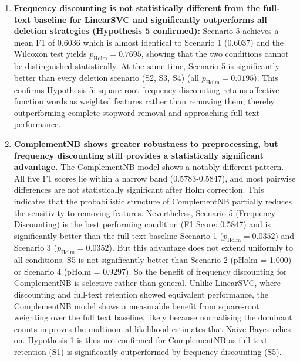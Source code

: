 \documentclass[a4paper,10pt]{article}
\begin{document}
\begin{enumerate}
    \item \textbf{Frequency discounting is not statistically different from the full-text baseline for LinearSVC and significantly
    outperforms all deletion strategies (Hypothesis 5 confirmed):} Scenario 5 achieves a mean F1 of 0.6036 which is almost identical to
    Scenario 1 (0.6037) and the Wilcoxon test yields $p_{\text{Holm}} = 0.7695$, showing that the two conditions cannot be distinguished statistically. At the same time, Scenario 5 is significantly better than every deletion scenario (S2, S3, S4) (all $p_{\text{Holm}} = 0.0195$). This confirms Hypothesis 5: square-root frequency discounting retains affective
    function words as weighted features rather than removing them, thereby outperforming complete stopword removal and approaching full-text performance.

    \item \textbf{ComplementNB shows greater robustness to preprocessing, but frequency discounting still provides a statistically
    significant advantage.} The ComplementNB model shows a notably different pattern. All five
    F1 scores lie within a narrow band (0.5783-0.5847), and most pairwise differences are not statistically significant after Holm correction.
    This indicates that the probabilistic structure of ComplementNB partially reduces the sensitivity to removing features. Nevertheless, Scenario 5 (Frequency Discounting) is the best performing condition (F1 Score: 0.5847) and is significantly better than the full text baseline Scenario 1 ($p_{\text{Holm}} = 0.0352$) and Scenario 3 ($p_{\text{Holm}} = 0.0352$). But this advantage does not extend uniformly to all conditions. S5 is not significantly better than Scenario 2 (pHolm = 1.000) or Scenario 4 (pHolm = 0.9297). So the benefit of frequency discounting for ComplementNB is selective rather than general. Unlike LinearSVC, where discounting and full-text retention showed equivalent performance, the ComplementNB model shows a measurable benefit from square-root weighting over the full text baseline, likely because normalising the dominant counts improves the multinomial likelihood estimates that Naive Bayes relies on. Hypothesis 1 is thus not confirmed for ComplementNB as full-text retention (S1) is significantly outperformed by frequency discounting (S5).


\end{enumerate}
\end{document}
